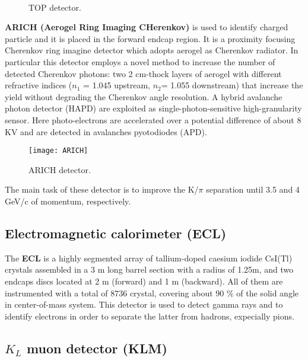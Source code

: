 \begin{figure}[h!]
\centering
{}\quad
{}\\
\caption{TOP detector.}
\label{TOP}
\end{figure}

\textbf{ARICH (Aerogel Ring Imaging CHerenkov)} is used to identify charged particle and it is placed in the forward endcap region. It is a proximity focusing Cherenkov ring imagine detector which adopts aerogel as Cherenkov radiator. In particular this detector employs a novel method to increase the number of detected Cherenkov photons: two 2 cm-thock layers of aerogel with different refractive indices ($n_{1}$ = 1.045 upstream, $n_{2}$= 1.055 downstream) that increase the yield without degrading the Cherenkov angle resolution.
A hybrid avalanche photon detector (HAPD) are exploited as single-photon-sensitive high-granularity sensor. Here photo-electrons are accelerated over a potential difference of about 8 KV and are detected in avalanches pyotodiodes (APD).\\

\begin{figure}
\centering
\texttt{[image: ARICH]}
\caption{ARICH detector.}
\label{ARICH}
\end{figure}


The main task of these detector is to improve the K/$\pi$ separation until 3.5 and 4 GeV/c of momentum, respectively.

\subsection{Electromagnetic calorimeter (ECL)}

The \textbf{ECL} is a highly segmented array of tallium-doped caesium iodide CsI(Tl) crystals assembled in a 3 m long barrel section with a radius of 1.25m, and two endcaps discs located at 2 m (forward) and 1 m (backward). All of them are instrumented with a total of 8736 crystal, covering about 90 \% of the solid angle in center-of-mass system. This detector is used to detect gamma rays and to identify electrons in order to separate the latter from hadrons, expecially pions.

\subsection{$K_{L}$ muon detector (KLM)}

